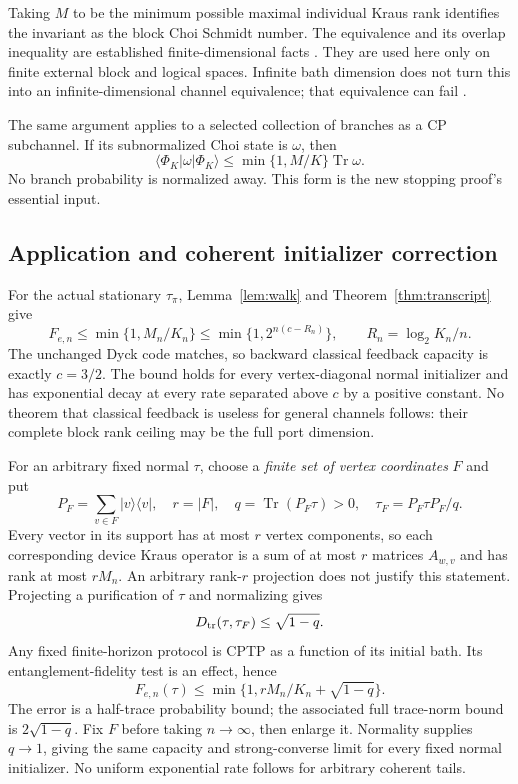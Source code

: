 \documentclass[11pt]{article}
\newcommand{\Tr}{\operatorname{Tr}}
\newcommand{\ket}[1]{\lvert #1\rangle}
\newcommand{\bra}[1]{\langle #1\rvert}
\newcommand{\D}{D_{\rm tr}}
\begin{document}
Taking $M$ to be the minimum possible maximal individual Kraus rank identifies the invariant as the block Choi Schmidt number. The equivalence and its overlap inequality are established finite-dimensional facts \cite{TH,CK}. They are used here only on finite external block and logical spaces. Infinite bath dimension does not turn this into an infinite-dimensional channel equivalence; that equivalence can fail \cite{Shirokov}.

The same argument applies to a selected collection of branches as a CP subchannel. If its subnormalized Choi state is $\omega$, then
\begin{equation}
 \bra{\Phi_K}\omega\ket{\Phi_K}\le
 \min\{1,M/K\}\Tr\omega.\label{eq:subchannel}
\end{equation}
No branch probability is normalized away. This form is the new stopping proof's essential input.

\subsection{Application and coherent initializer correction}

For the actual stationary $\tau_\pi$, Lemma~\ref{lem:walk} and Theorem~\ref{thm:transcript} give
\begin{equation}
 F_{e,n}\le\min\{1,M_n/K_n\}\le
 \min\{1,2^{n(c-R_n)}\},\qquad R_n=\log_2K_n/n.\label{eq:fixed}
\end{equation}
The unchanged Dyck code matches, so backward classical feedback capacity is exactly $c=3/2$. The bound holds for every vertex-diagonal normal initializer and has exponential decay at every rate separated above $c$ by a positive constant. No theorem that classical feedback is useless for general channels follows: their complete block rank ceiling may be the full port dimension.

For an arbitrary fixed normal $\tau$, choose a \emph{finite set of vertex coordinates} $F$ and put
\begin{equation}
 P_F=\sum_{v\in F}\ket v\bra v,\quad r=|F|,\quad
 q=\Tr(P_F\tau)>0,\quad \tau_F=P_F\tau P_F/q.\label{eq:cutoff}
\end{equation}
Every vector in its support has at most $r$ vertex components, so each corresponding device Kraus operator is a sum of at most $r$ matrices $A_{w,v}$ and has rank at most $rM_n$. An arbitrary rank-$r$ projection does not justify this statement. Projecting a purification of $\tau$ and normalizing gives
\begin{equation}
 \D(\tau,\tau_F)\le\sqrt{1-q}.\label{eq:gentle}
\end{equation}
Any fixed finite-horizon protocol is CPTP as a function of its initial bath. Its entanglement-fidelity test is an effect, hence
\begin{equation}
 F_{e,n}(\tau)\le\min\{1,rM_n/K_n+\sqrt{1-q}\}.\label{eq:coherentfixed}
\end{equation}
The error is a half-trace probability bound; the associated full trace-norm bound is $2\sqrt{1-q}$. Fix $F$ before taking $n\to\infty$, then enlarge it. Normality supplies $q\to1$, giving the same capacity and strong-converse limit for every fixed normal initializer. No uniform exponential rate follows for arbitrary coherent tails.
\end{document}
